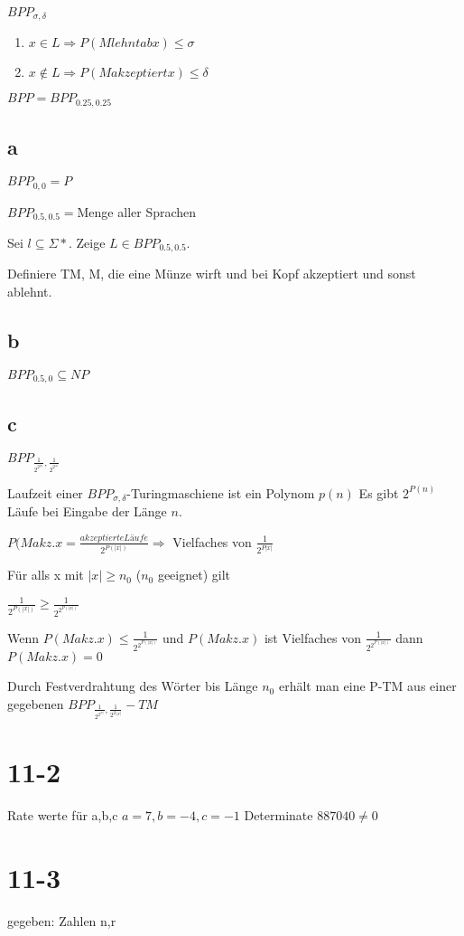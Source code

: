\documentclass[12pt, oneside, a4paper, numbers=enddot, abstracton, parskip=full]{scrreprt}
\begin{document}
$BPP_{\sigma, \delta}$
\begin{enumerate}
\item $x\in L \Rightarrow P(M lehnt ab x) \leq \sigma$  
\item $x\notin L \Rightarrow P(M akzeptiert x) \leq \delta$
\end{enumerate}
$BPP = BPP_{0.25, 0.25}$

\subsection{a}
$BPP_{0, 0} = P$

$BPP_{0.5, 0.5} = $Menge aller Sprachen

Sei $l\subseteq\Sigma*.$ Zeige $L\in BPP_{0.5, 0.5}$.

Definiere TM, M, die eine Münze wirft und bei Kopf akzeptiert und sonst ablehnt.

\subsection{b}
$BPP_{0.5, 0} \subseteq NP$

\subsection{c}
$BPP_{\frac{1}{2^{2^{|x|}}}, \frac{1}{2^{2^{|x|}}}}  $

Laufzeit einer $BPP_{\sigma, \delta}$-Turingmaschiene ist ein Polynom $p(n)$
Es gibt $2^{P(n)}$ Läufe bei Eingabe der Länge $n$.

$P(M akz.x= \frac{akzeptierte Läufe}{2^{P(|x|)}} \Rightarrow $ Vielfaches von $\frac{1}{2^{P|x|}}$

Für alls x mit $|x| \geq n_0$ ($n_0$ geeignet) gilt

$\frac{1}{2^{P(|x|)}} \geq \frac{1}{2^{2^{P(|x|)}}}$

Wenn $P(M akz. x) \leq \frac{1}{2^{2^{P(|x|)}}}$ und $P(M akz. x)$ ist Vielfaches von $ \frac{1}{2^{2^{P(|x|)}}}$
dann $P(M akz. x) = 0 $

Durch Festverdrahtung des Wörter bis Länge $n_0$ erhält man eine P-TM aus einer gegebenen $BPP_{\frac{1}{2^{2^{|x|}}}, \frac{1}{2^2{^{|x|}}}} - TM$

\section{11-2}
Rate werte für a,b,c
$a = 7, b=-4, c=-1$
Determinate $887040 \neq 0$

\section{11-3}
gegeben: Zahlen n,r
\end{document}
